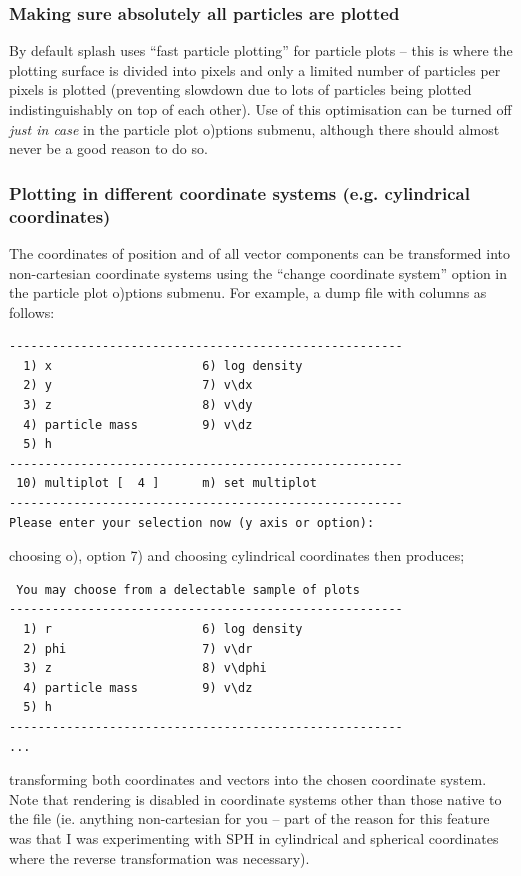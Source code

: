 \documentclass[a4paper,11pt]{article}
\begin{document}
\subsubsection{ Making sure absolutely all particles are plotted}
 By default splash uses ``fast particle plotting'' for particle plots -- this is where the plotting surface is divided into pixels and only a limited number of particles per pixels is plotted (preventing slowdown due to lots of particles being plotted indistinguishably on top of each other). Use of this optimisation can be turned off \emph{just in case} in the particle plot o)ptions submenu, although there should almost never be a good reason to do so.

\subsubsection{ Plotting in different coordinate systems (e.g. cylindrical coordinates)}
\label{sec:geom}
 The coordinates of position and of all vector components can be transformed into non-cartesian coordinate systems using the ``change coordinate system'' option in the particle plot o)ptions submenu. For example, a dump file with columns as follows:
\begin{verbatim}
-------------------------------------------------------
  1) x                     6) log density         
  2) y                     7) v\dx                
  3) z                     8) v\dy                
  4) particle mass         9) v\dz                
  5) h                   
-------------------------------------------------------
 10) multiplot [  4 ]      m) set multiplot 
-------------------------------------------------------
Please enter your selection now (y axis or option):
\end{verbatim}
choosing o), option 7) and choosing cylindrical coordinates then produces;
\begin{verbatim}
 You may choose from a delectable sample of plots 
-------------------------------------------------------
  1) r                     6) log density         
  2) phi                   7) v\dr                
  3) z                     8) v\dphi              
  4) particle mass         9) v\dz                
  5) h                   
-------------------------------------------------------
...
\end{verbatim}
transforming both coordinates and vectors into the chosen coordinate system. Note that rendering is disabled in coordinate systems other than those native to the file (ie. anything non-cartesian for you -- part of the reason for this feature was that I was experimenting with SPH in cylindrical and spherical coordinates where the reverse transformation was necessary). 
\end{document}
